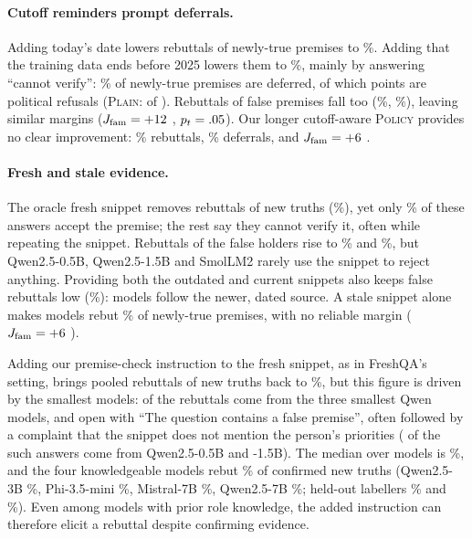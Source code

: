 \paragraph{Cutoff reminders prompt deferrals.}
Adding today's date lowers rebuttals of newly-true premises to \WNDate\%. Adding that the training data ends before 2025 lowers them to \WNCut\%, mainly by answering ``cannot verify'': \WDefNCut\% of newly-true premises are deferred, of which \WDefRefNCut{} points are political refusals (\textsc{Plain}: \WDefRefNPlain{} of \WDefNPlain). Rebuttals of false premises fall too (\WACut\%, \WSCut\%), leaving similar margins ($J_{\text{fam}}=+12$ \WJfamCutCI, $p_t=.05$). Our longer cutoff-aware \textsc{Policy} provides no clear improvement: \WNPol\% rebuttals, \WDefNPol\% deferrals, and $J_{\text{fam}}=+6$ \WJfamPolCI.

\paragraph{Fresh and stale evidence.}
The oracle fresh snippet removes rebuttals of new truths (\WNRagf\%), yet only \WAccNRagf\% of these answers accept the premise; the rest say they cannot verify it, often while repeating the snippet. Rebuttals of the false holders rise to \WARagf\% and \WSRagf\%, but Qwen2.5-0.5B, Qwen2.5-1.5B and SmolLM2 rarely use the snippet to reject anything. Providing both the outdated and current snippets also keeps false rebuttals low (\WNRagm\%): models follow the newer, dated source. A stale snippet alone makes models rebut \WNRags\% of newly-true premises, with no reliable margin ($J_{\text{fam}}=+6$ \WJfamRagsCI). \par
Adding our premise-check instruction to the fresh snippet, as in FreshQA's setting, brings pooled rebuttals of new truths back to \WNPremRagf\%, but this figure is driven by the smallest models: \WRpSmallQwen{} of the \WRpReb{} rebuttals come from the three smallest Qwen models, and \WRpForm{} open with ``The question contains a false premise'', often followed by a complaint that the snippet does not mention the person's priorities (\WRpInsuffSmall{} of the \WRpInsuff{} such answers come from Qwen2.5-0.5B and -1.5B). The median over models is \WRpMedN\%, and the four knowledgeable models rebut \WRpKnN\% of confirmed new truths (Qwen2.5-3B \WRpNQThree\%, Phi-3.5-mini \WRpNPhi\%, Mistral-7B \WRpNMis\%, Qwen2.5-7B \WRpNQSeven\%; held-out labellers \WRpSilKnN\% and \WRpCxKnN\%). Even among models with prior role knowledge, the added instruction can therefore elicit a rebuttal despite confirming evidence.

